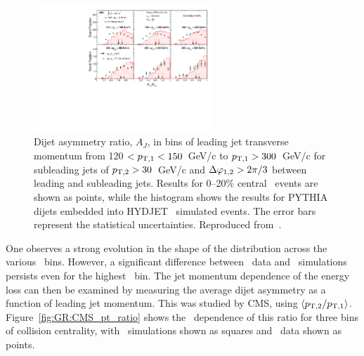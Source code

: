 \begin{figure}[!th]
\begin{center}
\includegraphics[width=0.6\textwidth]{jetfigures/dijet_imbalance5_0to20_pt_20120103_subt.pdf}
\caption{Dijet asymmetry ratio, $A_{J}$, in bins of leading jet transverse momentum from
120 $ < p_{\rm{T},1} < 150$~GeV/c to $p_{\rm{T},1} > 300$~GeV/c for
  subleading jets of $p_{\rm{T},2}> 30$~GeV/c
and $\Delta\varphi_{1,2}>2\pi/3$ between leading and subleading jets.
Results for 0--20\% central \PbPb\ events are shown as points, while the histogram
shows the results for
PYTHIA dijets embedded into HYDJET \PbPb\ simulated events. The error bars represent the statistical uncertainties.
Reproduced from~\cite{CMS_dijet}.}
\label{fig:GR:CMS_dijet_pt}
\end{center}
\end{figure}
One observes a strong evolution in the shape of the distribution across the
various \pT\ bins. However, a significant difference between \PbPb\ data and
\PYTHYD\ simulations persists even for the highest \pT\ bin.
The jet momentum dependence of the energy loss can then be examined by measuring the
average dijet asymmetry as a function of leading jet momentum. This was studied by CMS,
using $\langle p_{\rm{T},2}/p_{\rm{T},1} \rangle$. Figure~\ref{fig:GR:CMS_pt_ratio}
shows the \pT\ dependence of this ratio for three
bins of collision centrality, with \PYTHYD\ simulations shown
as squares and \PbPb\ data shown as points.

